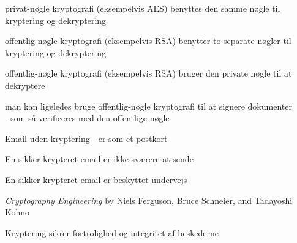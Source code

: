 \documentclass[20pt,landscape,a4paper,footrule]{foils}
\begin{document}


\begin{list1}
\item privat-nøgle kryptografi (eksempelvis AES) benyttes den samme
  nøgle til kryptering og dekryptering
\item offentlig-nøgle kryptografi (eksempelvis RSA) benytter to
  separate nøgler til kryptering og dekryptering
\end{list1}



\begin{list1}
\item offentlig-nøgle kryptografi (eksempelvis RSA) bruger den private
  nøgle til at dekryptere
\item man kan ligeledes bruge offentlig-nøgle kryptografi til at
  signere dokumenter\\ - som så verificeres med den offentlige nøgle
\end{list1}




\centerline{Email uden kryptering - er som et postkort}






\centerline{En sikker krypteret email er ikke sværere at sende}



\centerline{En sikker krypteret email er beskyttet undervejs}



\emph{Cryptography Engineering} by
Niels Ferguson, Bruce Schneier, and Tadayoshi Kohno

\centerline{Kryptering sikrer fortrolighed og integritet af beskederne}

\end{document}
